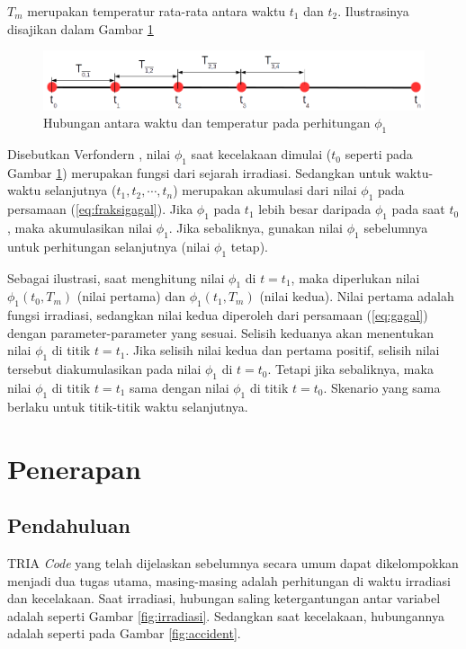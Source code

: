\documentclass[a4paper,11pt]{report}
\begin{document}
$T_m$ merupakan temperatur rata-rata antara waktu $t_1$ dan $t_2$. Ilustrasinya disajikan dalam Gambar \ref{fig:pertumbuhanPhi} 
\begin{figure}
  \begin{center}
    \includegraphics[scale=.5]{pics/akumulasiPhi.png}
    \caption{Hubungan antara waktu dan temperatur pada perhitungan $\phi_1$}
    \label{fig:pertumbuhanPhi}
  \end{center}
\end{figure}

Disebutkan Verfondern \cite{report1}, nilai $\phi_1$ saat kecelakaan dimulai ($t_0$ seperti pada Gambar \ref{fig:pertumbuhanPhi}) merupakan fungsi dari sejarah irradiasi. Sedangkan untuk waktu-waktu selanjutnya ($t_1, t_2, \cdots, t_n$) merupakan akumulasi dari nilai $\phi_1$ pada persamaan (\ref{eq:fraksigagal}). Jika $\phi_1$ pada $t_1$ lebih besar daripada $\phi_1$ pada saat $t_0$, maka akumulasikan nilai $\phi_1$. Jika sebaliknya, gunakan nilai $\phi_1$ sebelumnya untuk perhitungan selanjutnya (nilai $\phi_1$ tetap). 

Sebagai ilustrasi, saat menghitung nilai $\phi_1$ di $t=t_1$, maka diperlukan nilai $\phi_1(t_0, T_m)$ (nilai pertama) dan $\phi_1(t_1, T_m)$ (nilai kedua). Nilai pertama adalah fungsi irradiasi, sedangkan nilai kedua diperoleh dari persamaan (\ref{eq:gagal}) dengan parameter-parameter yang sesuai. Selisih keduanya akan menentukan nilai $\phi_1$ di titik $t=t_1$. Jika selisih nilai kedua dan pertama positif, selisih nilai tersebut diakumulasikan pada nilai $\phi_1$ di $t=t_0$. Tetapi jika sebaliknya, maka nilai $\phi_1$ di titik $t=t_1$ sama dengan nilai $\phi_1$ di titik $t=t_0$. Skenario yang sama berlaku untuk titik-titik waktu selanjutnya.

\chapter{Penerapan}
\section{Pendahuluan}
\label{sec:introPenerapan}
TRIA \textit{Code} yang telah dijelaskan sebelumnya secara umum dapat dikelompokkan menjadi dua tugas utama, masing-masing adalah perhitungan di waktu irradiasi dan kecelakaan. Saat irradiasi, hubungan saling ketergantungan antar variabel adalah seperti Gambar \ref{fig:irradiasi}. Sedangkan saat kecelakaan, hubungannya adalah seperti pada Gambar \ref{fig:accident}.
\end{document}
